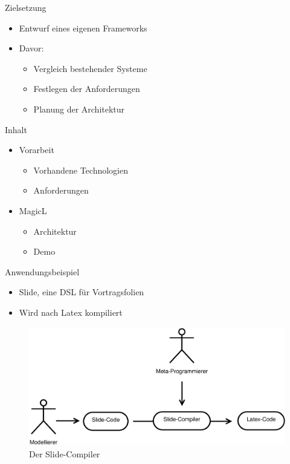 \documentclass{beamer}
\begin{document}
\begin{frame}{Zielsetzung}
  \begin{itemize}
  \item Entwurf eines eigenen Frameworks
  \item Davor:
    \begin{itemize}
    \item Vergleich bestehender Systeme
    \item Festlegen der Anforderungen
    \item Planung der Architektur
    \end{itemize}
  \end{itemize}
\end{frame}

\begin{frame}{Inhalt}
  \begin{itemize}
  \item Vorarbeit
    \begin{itemize}
    \item Vorhandene Technologien
    \item Anforderungen
    \end{itemize}
  \item MagicL
    \begin{itemize}
    \item Architektur
    \item Demo
    \end{itemize}
  \end{itemize}
\end{frame}

\begin{frame}{Anwendungsbeispiel}
  \begin{itemize}
  \item Slide, eine DSL für Vortragsfolien
  \item Wird nach Latex kompiliert
  \end{itemize}
  \begin{figure}
    \centering
    \includegraphics[scale=0.3]{images/flow_example_simple}
    \caption{Der Slide-Compiler}
  \end{figure}
\end{frame}
\end{document}
